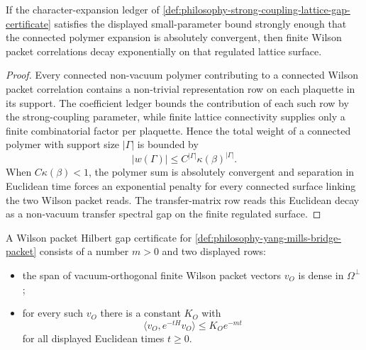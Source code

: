 \begin{theorem}
\label{thm:philosophy-finite-strong-coupling-packet-decay}
If the character-expansion ledger of
\autoref{def:philosophy-strong-coupling-lattice-gap-certificate} satisfies
the displayed small-parameter bound strongly enough that the connected
polymer expansion is absolutely convergent, then finite Wilson packet
correlations decay exponentially on that regulated lattice surface.
\end{theorem}
\begin{proof}
Every connected non-vacuum polymer contributing to a connected Wilson packet
correlation contains a non-trivial representation row on each plaquette in
its support. The coefficient ledger bounds the contribution of each such row
by the strong-coupling parameter, while finite lattice connectivity supplies
only a finite combinatorial factor per plaquette. Hence the total weight of
a connected polymer with support size $|\Gamma|$ is bounded by
$$
|w(\Gamma)|\le C^{|\Gamma|}\kappa(\beta)^{|\Gamma|}.
$$
When $C\kappa(\beta)<1$, the polymer sum is absolutely convergent and
separation in Euclidean time forces an exponential penalty for every
connected surface linking the two Wilson packet reads. The transfer-matrix
row reads this Euclidean decay as a non-vacuum transfer spectral gap on the
finite regulated surface.
\end{proof}

\begin{definition}
\label{def:philosophy-wilson-packet-hilbert-gap-certificate}
A Wilson packet Hilbert gap certificate for
\autoref{def:philosophy-yang-mills-bridge-packet} consists of a number
$m>0$ and two displayed rows:
\begin{itemize}
\item the span of vacuum-orthogonal finite Wilson packet vectors $v_O$ is
dense in $\Omega^{\perp}$;
\item for every such $v_O$ there is a constant $K_O$ with
$$
\langle v_O,e^{-tH}v_O\rangle\le K_O e^{-mt}
$$
for all displayed Euclidean times $t\ge 0$.
\end{itemize}
\end{definition}

